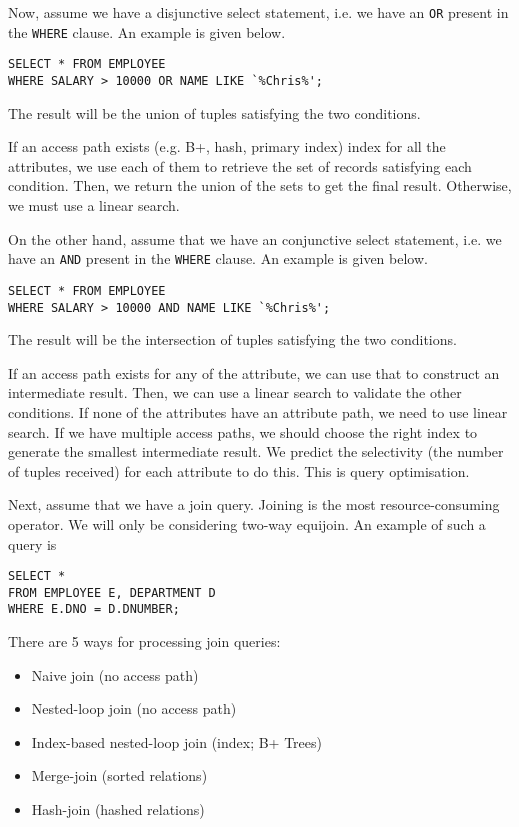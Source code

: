 \documentclass[a4paper, openany]{memoir}
\theoremstyle{definition}
\theoremstyle{plain}
\begin{document}
Now, assume we have a disjunctive select statement, i.e. we have an \texttt{OR} present in the \texttt{WHERE} clause. An example is given below.
\begin{verbatim}
SELECT * FROM EMPLOYEE 
WHERE SALARY > 10000 OR NAME LIKE `%Chris%';
\end{verbatim}
The result will be the union of tuples satisfying the two conditions. 

If an access path exists (e.g. B+, hash, primary index) index for all the attributes, we use each of them to retrieve the set of records satisfying each condition. Then, we return the union of the sets to get the final result. Otherwise, we must use a linear search.

On the other hand, assume that we have an conjunctive select statement, i.e. we have an \texttt{AND} present in the \texttt{WHERE} clause. An example is given below.
\begin{verbatim}
SELECT * FROM EMPLOYEE 
WHERE SALARY > 10000 AND NAME LIKE `%Chris%';
\end{verbatim}
The result will be the intersection of tuples satisfying the two conditions. 

If an access path exists for any of the attribute, we can use that to construct an intermediate result. Then, we can use a linear search to validate the other conditions. If none of the attributes have an attribute path, we need to use linear search. If we have multiple access paths, we should choose the right index to generate the smallest intermediate result. We predict the selectivity (the number of tuples received) for each attribute to do this. This is query optimisation.

Next, assume that we have a join query. Joining is the most resource-consuming operator. We will only be considering two-way equijoin. An example of such a query is
\begin{verbatim}
SELECT *
FROM EMPLOYEE E, DEPARTMENT D
WHERE E.DNO = D.DNUMBER;
\end{verbatim}
There are 5 ways for processing join queries:
\begin{itemize}
    \item Naive join (no access path)
    \item Nested-loop join (no access path)
    \item Index-based nested-loop join (index; B+ Trees)
    \item Merge-join (sorted relations)
    \item Hash-join (hashed relations)
\end{itemize}
\end{document}
